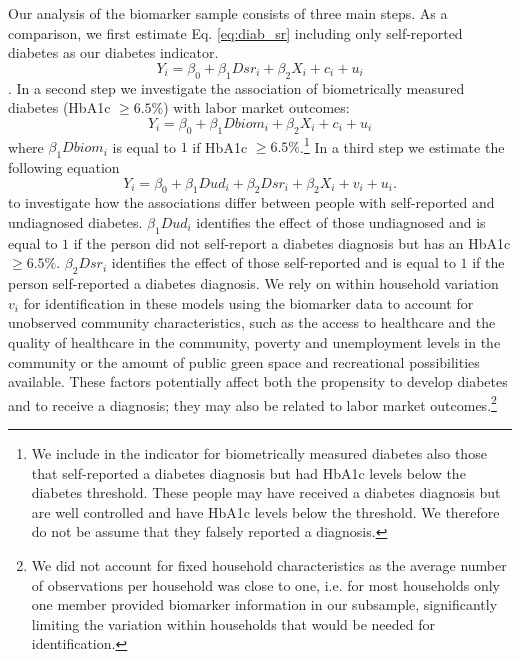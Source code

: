 \documentclass[12pt,english]{article}
\begin{document}
{Our analysis of the biomarker sample consists of three main steps. As a comparison, we first estimate Eq. \ref{eq:diab_sr} including only self-reported diabetes as our diabetes indicator.
\begin{equation}
Y_{i}=\beta_{0}+\beta_{1}Dsr_{i}+\beta_{2}X_{i}+c_{i}+u_{i}\label{eq:diab_sr}
\end{equation}. 
In a second step we investigate the association of biometrically  
measured diabetes (HbA1c $\geq6.5\%$) with labor market outcomes: 
\begin{equation}
Y_{i}=\beta_{0}+\beta_{1}Dbiom_{i}+\beta_{2}X_{i}+c_{i}+u_{i}\label{eq:diab_objective}
\end{equation}
where $\beta_{1}Dbiom_{i}$ is equal to $1$ if HbA1c $\geq6.5\%$.\footnote{We include in the indicator for biometrically measured diabetes also those that self-reported a diabetes diagnosis but had \ac{HbA1c} levels below the diabetes threshold. These people may have received a diabetes diagnosis but are well controlled and have \ac{HbA1c} levels below the threshold. We therefore do not be assume that they falsely reported a diagnosis.}
In a third step we estimate the following equation 
\begin{equation}
Y_{i}=\beta_{0}+\beta_{1}Dud_{i}+\beta_{2}Dsr_{i}+\beta_{2}X_{i}+v_{i}+u_{i}.\label{eq:diab_sr_ud}
\end{equation}
to investigate how the associations differ between people with self-reported and undiagnosed diabetes. $\beta_{1}Dud_{i}$ identifies the effect of those undiagnosed and is equal to $1$ if the person did not self-report a diabetes diagnosis but has an HbA1c $\geq6.5\%$. $\beta_{2}Dsr_{i}$ identifies the effect of those self-reported and is equal to $1$ if the person self-reported a diabetes diagnosis.  We rely on within household variation $v_{i}$ for identification in these models using the biomarker data to account for unobserved community characteristics, such as the access to healthcare and the quality of healthcare in the community, poverty and unemployment levels in the community or the amount of public green space and recreational possibilities available. These factors potentially affect both the propensity to develop diabetes and to receive a diagnosis; they may also be related to labor market outcomes.\footnote{We did not account for fixed household characteristics as the average number of observations per household was close to one, i.e. for most households only one member provided biomarker information in our subsample, significantly limiting the variation within households that would be needed for identification.}

}
\end{document}
